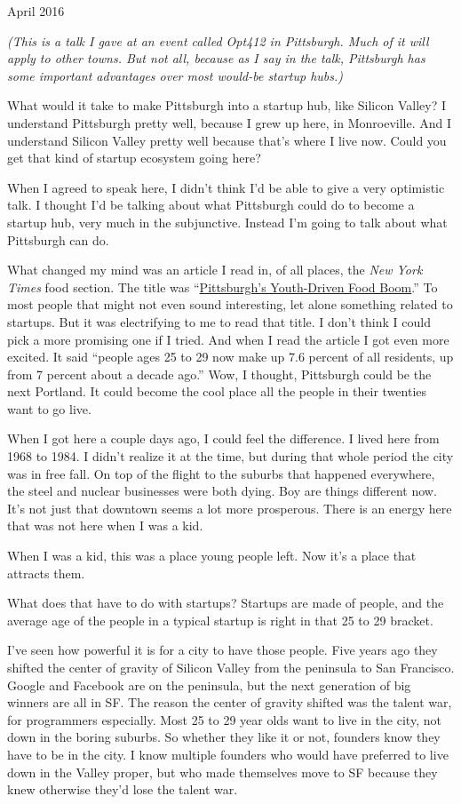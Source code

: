 \documentclass[12pt]{book}
\begin{document}
April 2016

\emph{(This is a talk I gave at an event called Opt412 in Pittsburgh.
Much of it will apply to other towns. But not all, because as I say in
the talk, Pittsburgh has some important advantages over most would-be
startup hubs.)}

What would it take to make Pittsburgh into a startup hub, like Silicon
Valley? I understand Pittsburgh pretty well, because I grew up here, in
Monroeville. And I understand Silicon Valley pretty well because that's
where I live now. Could you get that kind of startup ecosystem going
here?

When I agreed to speak here, I didn't think I'd be able to give a very
optimistic talk. I thought I'd be talking about what Pittsburgh could do
to become a startup hub, very much in the subjunctive. Instead I'm going
to talk about what Pittsburgh can do.

What changed my mind was an article I read in, of all places, the
\emph{New York Times} food section. The title was
``\href{http://www.nytimes.com/2016/03/16/dining/pittsburgh-restaurants.html}{Pittsburgh's
Youth-Driven Food Boom}.'' To most people that might not even sound
interesting, let alone something related to startups. But it was
electrifying to me to read that title. I don't think I could pick a more
promising one if I tried. And when I read the article I got even more
excited. It said ``people ages 25 to 29 now make up 7.6 percent of all
residents, up from 7 percent about a decade ago.'' Wow, I thought,
Pittsburgh could be the next Portland. It could become the cool place
all the people in their twenties want to go live.

When I got here a couple days ago, I could feel the difference. I lived
here from 1968 to 1984. I didn't realize it at the time, but during that
whole period the city was in free fall. On top of the flight to the
suburbs that happened everywhere, the steel and nuclear businesses were
both dying. Boy are things different now. It's not just that downtown
seems a lot more prosperous. There is an energy here that was not here
when I was a kid.

When I was a kid, this was a place young people left. Now it's a place
that attracts them.

What does that have to do with startups? Startups are made of people,
and the average age of the people in a typical startup is right in that
25 to 29 bracket.

I've seen how powerful it is for a city to have those people. Five years
ago they shifted the center of gravity of Silicon Valley from the
peninsula to San Francisco. Google and Facebook are on the peninsula,
but the next generation of big winners are all in SF. The reason the
center of gravity shifted was the talent war, for programmers
especially. Most 25 to 29 year olds want to live in the city, not down
in the boring suburbs. So whether they like it or not, founders know
they have to be in the city. I know multiple founders who would have
preferred to live down in the Valley proper, but who made themselves
move to SF because they knew otherwise they'd lose the talent war.
\end{document}
